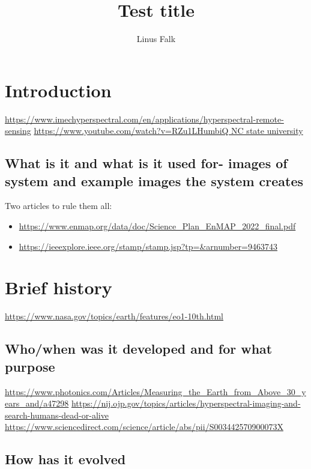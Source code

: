 \documentclass[a4paper]{article}
\title{Test title}
\author{Linus Falk}
\begin{document}
\maketitle

\section{Introduction}
\url{https://www.imechyperspectral.com/en/applications/hyperspectral-remote-sensing}
\url{https://www.youtube.com/watch?v=RZu1LHumbiQ NC state university}

    \subsection*{What is it and what is it used for- images of system and example 
    images the system creates
    }

    Two articles to rule them all: 
    \begin{itemize}
        \item \url{https://www.enmap.org/data/doc/Science_Plan_EnMAP_2022_final.pdf}
        \item \url{https://ieeexplore.ieee.org/stamp/stamp.jsp?tp=&arnumber=9463743}
    \end{itemize}


\section{Brief history}
\url{https://www.nasa.gov/topics/earth/features/eo1-10th.html}



    \subsection*{Who/when was it developed and for what purpose}
    \url{https://www.photonics.com/Articles/Measuring_the_Earth_from_Above_30_years_and/a47298}
    \url{https://nij.ojp.gov/topics/articles/hyperspectral-imaging-and-search-humans-dead-or-alive}
    \url{https://www.sciencedirect.com/science/article/abs/pii/S003442570900073X}

    \subsection*{How has it evolved}
\end{document}
